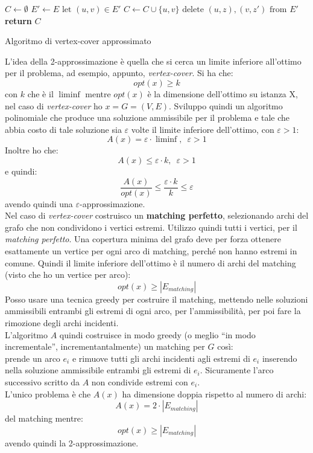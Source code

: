 \documentclass[a4paper,12pt, oneside]{book}
\begin{document}
\begin{algorithm}
  \begin{algorithmic}
    \State $C\gets\emptyset$
    \State $E'\gets E$
    \State $\mbox{let }(u,v)\in E'$
    \State $C\gets C\cup \{u,v\}$
    \State $\mbox{delete } (u,z),(v,z') \mbox{ from } E'$
    \EndFor
    \EndWhile
    \State \textbf{return} $C$
    \EndFunction
  \end{algorithmic}
  \caption{Algoritmo di vertex-cover approssimato}
\end{algorithm}
\newpage
L'idea della 2-approssimazione è quella che si cerca un limite inferiore
all'ottimo per il problema, ad esempio, appunto, \textit{vertex-cover}. Si ha
che:
\[opt(x)\geq k\]
con $k$ che è il $\liminf$ mentre $opt(x)$ è la dimensione dell'ottimo su
istanza X, nel caso di \textit{vertex-cover} ho $x=G=(V,E)$. Sviluppo quindi un
algoritmo polinomiale che produce una soluzione ammissibile per il problema e
tale che abbia costo di tale soluzione sia $\varepsilon$ volte il limite
inferiore dell'ottimo, con $\varepsilon>1$:
\[A(x)=\varepsilon\cdot \liminf,\,\,\,\varepsilon>1\]
Inoltre ho che:
\[A(x)\leq \varepsilon\cdot k,\,\,\,\varepsilon>1\]
e quindi:
\[\frac{A(x)}{opt(x)}\leq\frac{\varepsilon\cdot k}{k}\leq \varepsilon\]
avendo quindi una $\varepsilon$-approssimazione.\\
Nel caso di \textit{vertex-cover} costruisco un \textbf{matching perfetto},
selezionando archi del grafo che non condividono i vertici estremi. Utilizzo
quindi tutti i vertici, per il \textit{matching perfetto}. Una copertura minima
del grafo deve per forza ottenere esattamente un vertice per ogni arco di
matching, perché non hanno estremi in comune. Quindi il limite inferiore
dell'ottimo è il numero di archi del matching (visto che ho un vertice per
arco):
\[opt(x)\geq |E_{matching}|\]
Posso usare una tecnica greedy per costruire il matching, mettendo nelle
soluzioni ammissibili entrambi gli estremi di ogni arco, per l'ammissibilità,
per poi fare la rimozione degli archi incidenti.\\
L'algoritmo $A$ quindi costruisce in modo greedy (o meglio ``in modo
incrementale'', incrementantalmente) un matching per $G$ così:
\\
prende un arco $e_i$ e rimuove tutti gli archi incidenti agli estremi
di $e_i$ inserendo nella soluzione ammissibile entrambi gli estremi di
$e_i$. Sicuramente l'arco successivo scritto da $A$ non condivide estremi con
$e_i$.\\
L'unico problema è che $A(x)$ ha dimensione doppia rispetto al numero di archi:
\[A(x)=2\cdot |E_{matching}|\]
del matching mentre:
\[opt(x)\geq |E_{matching}|\]
avendo quindi la 2-approssimazione.\\
\end{document}
